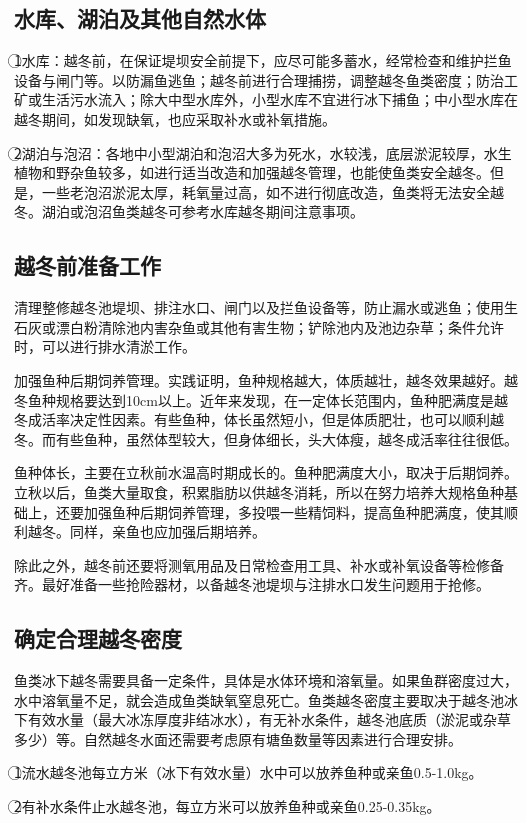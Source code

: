 \documentclass{ctexbook}
\begin{document}
\subsection{水库、湖泊及其他自然水体}
\textcircled{1}水库：越冬前，在保证堤坝安全前提下，应尽可能多蓄水，经常检查和维护拦鱼设备与闸门等。以防漏鱼逃鱼；越冬前进行合理捕捞，调整越冬鱼类密度；防治工矿或生活污水流入；除大中型水库外，小型水库不宜进行冰下捕鱼；中小型水库在越冬期间，如发现缺氧，也应采取补水或补氧措施。

\textcircled{2}湖泊与泡沼：各地中小型湖泊和泡沼大多为死水，水较浅，底层淤泥较厚，水生植物和野杂鱼较多，如进行适当改造和加强越冬管理，也能使鱼类安全越冬。但是，一些老泡沼淤泥太厚，耗氧量过高，如不进行彻底改造，鱼类将无法安全越冬。湖泊或泡沼鱼类越冬可参考水库越冬期间注意事项。
\subsection{越冬前准备工作}
清理整修越冬池堤坝、排注水口、闸门以及拦鱼设备等，防止漏水或逃鱼；使用生石灰或漂白粉清除池内害杂鱼或其他有害生物；铲除池内及池边杂草；条件允许时，可以进行排水清淤工作。

加强鱼种后期饲养管理。实践证明，鱼种规格越大，体质越壮，越冬效果越好。越冬鱼种规格要达到10cm以上。近年来发现，在一定体长范围内，鱼种肥满度是越冬成活率决定性因素。有些鱼种，体长虽然短小，但是体质肥壮，也可以顺利越冬。而有些鱼种，虽然体型较大，但身体细长，头大体瘦，越冬成活率往往很低。

鱼种体长，主要在立秋前水温高时期成长的。鱼种肥满度大小，取决于后期饲养。立秋以后，鱼类大量取食，积累脂肪以供越冬消耗，所以在努力培养大规格鱼种基础上，还要加强鱼种后期饲养管理，多投喂一些精饲料，提高鱼种肥满度，使其顺利越冬。同样，亲鱼也应加强后期培养。

除此之外，越冬前还要将测氧用品及日常检查用工具、补水或补氧设备等检修备齐。最好准备一些抢险器材，以备越冬池堤坝与注排水口发生问题用于抢修。
\subsection{确定合理越冬密度}
鱼类冰下越冬需要具备一定条件，具体是水体环境和溶氧量。如果鱼群密度过大，水中溶氧量不足，就会造成鱼类缺氧窒息死亡。鱼类越冬密度主要取决于越冬池冰下有效水量（最大冰冻厚度非结冰水），有无补水条件，越冬池底质（淤泥或杂草多少）等。自然越冬水面还需要考虑原有塘鱼数量等因素进行合理安排。

\textcircled{1}流水越冬池每立方米（冰下有效水量）水中可以放养鱼种或亲鱼0.5-1.0kg。

\textcircled{2}有补水条件止水越冬池，每立方米可以放养鱼种或亲鱼0.25-0.35kg。
\end{document}
